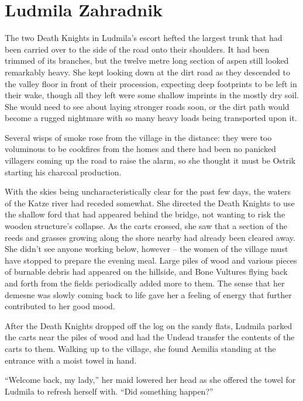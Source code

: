 \chapter{Ludmila Zahradnik}

The two Death Knights in Ludmila’s escort hefted the largest trunk that had been carried over to the side of the road onto their shoulders. It had been trimmed of its branches, but the twelve metre long section of aspen still looked remarkably heavy. She kept looking down at the dirt road as they descended to the valley floor in front of their procession, expecting deep footprints to be left in their wake, though all they left were some shallow imprints in the mostly dry soil. She would need to see about laying stronger roads soon, or the dirt path would become a rugged nightmare with so many heavy loads being transported upon it.

 

Several wisps of smoke rose from the village in the distance: they were too voluminous to be cookfires from the homes and there had been no panicked villagers coming up the road to raise the alarm, so she thought it must be Ostrik starting his charcoal production.

 

With the skies being uncharacteristically clear for the past few days, the waters of the Katze river had receded somewhat. She directed the Death Knights to use the shallow ford that had appeared behind the bridge, not wanting to risk the wooden structure’s collapse. As the carts crossed, she saw that a section of the reeds and grasses growing along the shore nearby had already been cleared away. She didn’t see anyone working below, however – the women of the village must have stopped to prepare the evening meal. Large piles of wood and various pieces of burnable debris had appeared on the hillside, and Bone Vultures flying back and forth from the fields periodically added more to them. The sense that her demesne was slowly coming back to life gave her a feeling of energy that further contributed to her good mood.

 

After the Death Knights dropped off the log on the sandy flats, Ludmila parked the carts near the piles of wood and had the Undead transfer the contents of the carts to them. Walking up to the village, she found Aemilia standing at the entrance with a moist towel in hand.

 

“Welcome back, my lady,” her maid lowered her head as she offered the towel for Ludmila to refresh herself with. “Did something happen?”

